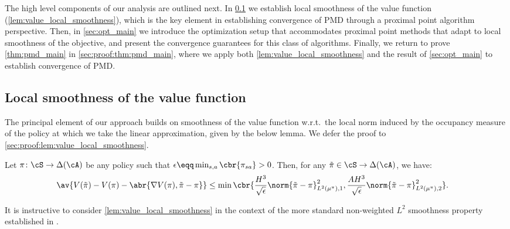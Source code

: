 The high level components of our analysis are outlined next. In \cref{sec:value_smooth_main} we establish local smoothness of the value function (\cref{lem:value_local_smoothness}), which is the key element in establishing convergence of PMD through a proximal point algorithm perspective.
Then, in \cref{sec:opt_main} we introduce the optimization setup that accommodates proximal point methods that adapt to local smoothness of the objective, and present the  convergence guarantees for this class of algorithms. Finally, we return to prove \cref{thm:pmd_main} in \cref{sec:proof:thm:pmd_main}, where we apply both \cref{lem:value_local_smoothness} and the result of \cref{sec:opt_main} to establish convergence of PMD.




\subsection{Local smoothness of the value function}
\label{sec:value_smooth_main}
The principal element of our approach builds on smoothness of the value function w.r.t.~the local norm induced by the occupancy measure of the policy at which we take the linear approximation, given by the below lemma. We defer the proof to \cref{sec:proof:lem:value_local_smoothness}.
\begin{lemma}\label{lem:value_local_smoothness}
    Let $\pi\colon \cS \to \Delta(\cA)$ be any policy such that $\epsilon\eqq \min_{s, a}\cbr{\pi_{sa}} > 0$.
    Then, for any $\tilde \pi \in \cS \to \Delta(\cA)$, we have:
    \begin{align*}
        &\av{V(\tilde \pi) - V(\pi) - \abr{\nabla V(\pi), \tilde \pi - \pi}}
        \leq 
        \min\cbr{
        \frac{ H^3}{\sqrt \epsilon}
            \norm{\tilde \pi - \pi}_{L^2(\mu^\pi), 1}^2,
        \frac{ A H^3}{\sqrt \epsilon}
            \norm{\tilde \pi - \pi}_{L^2(\mu^\pi), 2}^2
        }.
    \end{align*}
\end{lemma}
It is instructive to consider
\cref{lem:value_local_smoothness} in the context of the more standard non-weighted $L^2$ smoothness property established in \citet{agarwal2021theory}.
